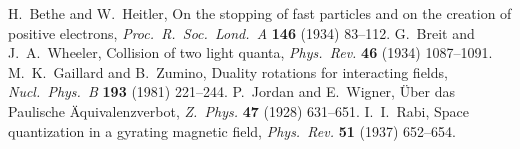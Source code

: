  H.~Bethe and W.~Heitler, On the stopping of fast particles and on the creation of positive electrons, \emph{Proc.\ R.\ Soc.\ Lond.\ A} \textbf{146} (1934) 83--112.
 G.~Breit and J.~A.~Wheeler, Collision of two light quanta, \emph{Phys.\ Rev.} \textbf{46} (1934) 1087--1091.
 M.~K.~Gaillard and B.~Zumino, Duality rotations for interacting fields, \emph{Nucl.\ Phys.\ B} \textbf{193} (1981) 221--244.
 P.~Jordan and E.~Wigner, \"Uber das Paulische \"Aquivalenzverbot, \emph{Z.\ Phys.} \textbf{47} (1928) 631--651.
 I.~I.~Rabi, Space quantization in a gyrating magnetic field, \emph{Phys.\ Rev.} \textbf{51} (1937) 652--654.
